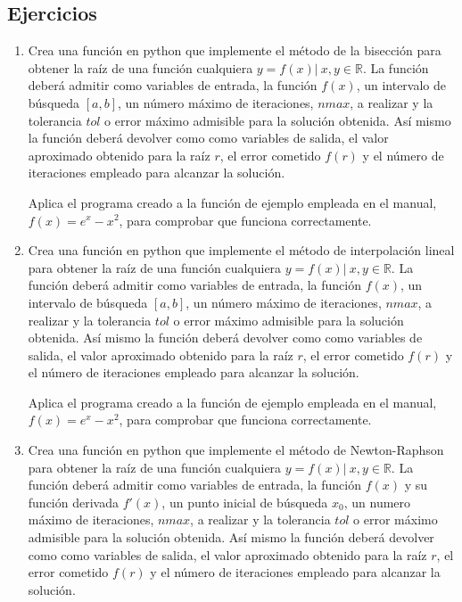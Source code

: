 \begin{paracol}{2}
\section{Ejercicios}
\begin{enumerate}
\item Crea una función en python que implemente el método de  la bisección para obtener la raíz de una función cualquiera $y = f(x)\vert\  x, y \in \mathbb{R}$. La función deberá admitir como variables de entrada, la función $f(x)$, un intervalo de búsqueda $[a,b]$, un número máximo de iteraciones, $nmax$, a realizar y la tolerancia $tol$ o error máximo admisible para la solución obtenida. Así mismo la función deberá devolver como como variables de salida, el valor aproximado obtenido para la raíz $r$, el error cometido $f(r)$ y el número de iteraciones empleado para alcanzar la solución. 

Aplica el programa creado a la función de ejemplo empleada en el manual, $f(x) = e^x-x^2$, para comprobar que funciona correctamente.

\item Crea una función en python que implemente el método de  interpolación lineal para obtener la raíz de una función cualquiera $y = f(x)\vert\  x, y \in \mathbb{R}$. La función deberá admitir como variables de entrada, la función $f(x)$, un intervalo de búsqueda $[a,b]$, un número máximo de iteraciones, $nmax$, a realizar y la tolerancia $tol$ o error máximo admisible para la solución obtenida. Así mismo la función deberá devolver como como variables de salida, el valor aproximado obtenido para la raíz $r$, el error cometido $f(r)$ y el número de iteraciones empleado para alcanzar la solución.

Aplica el programa creado a la función de ejemplo empleada en el manual, $f(x) = e^x-x^2$, para comprobar que funciona correctamente.

\item Crea una función en python que implemente el método de  Newton-Raphson para obtener la raíz de una función cualquiera $y = f(x)\vert\  x, y \in \mathbb{R}$. La función deberá admitir como variables de entrada, la función $f(x)$ y su función derivada $f'(x)$, un punto inicial de búsqueda $x_0$, un numero máximo de iteraciones, $nmax$, a realizar y la tolerancia $tol$ o error máximo admisible para la solución obtenida. Así mismo la función deberá devolver como como variables de salida, el valor aproximado obtenido para la raíz $r$, el error cometido $f(r)$ y el número de iteraciones empleado para alcanzar la solución.


\end{enumerate}
\end{paracol}
